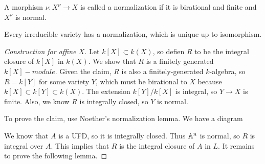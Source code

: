 \documentclass[twoside, 10pt]{article}
\begin{document}
        \begin{defn}
            A morphism $\nu:X^{\nu} \to X$ is called a normalization if it is birational and finite and $X^{\nu}$ is normal.
        \end{defn}

        \begin{thm}
            Every irreducible variety has a normalization, which is unique up to isomorphism.
            \begin{proof}[Construction for affine $X$]
                Let $k[X] \subset k(X)$, so defien $R$ to be the integral closure of $k[X]$ in $k(X)$. We show that $R$ is a finitely generated $k[X]-module$. Given the claim, $R$ is also a finitely-generated $k$-algebra, so $R=k[Y]$ for some variety $Y$, which must be birational to $X$ because $k[X] \subset k[Y] \subset k(X)$. The extension $k[Y] /k[X]$ is integral, so $Y \to X$ is finite. Also, we know $R$ is integrally closed, so $Y$ is normal.

                To prove the claim, use Noether's normalization lemma. We have a diagram

                \begin{center}
                \end{center}
                We know that $A$ is a UFD, so it is integrally closed. Thus $\mathbb{A}^n$ is normal, so $R$ is integral over $A$. This implies that $R$ is the integral closure of $A$ in $L$. It remains to prove the following lemma.
            \end{proof}
        \end{thm}
\end{document}
